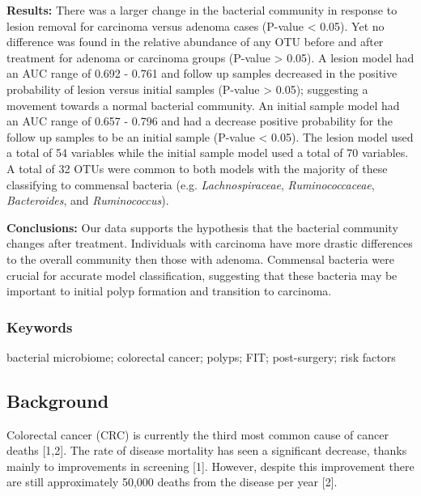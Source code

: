 \documentclass[12pt,]{article}
\begin{document}
\textbf{Results:} There was a larger change in the bacterial community
in response to lesion removal for carcinoma versus adenoma cases
(P-value \textless{} 0.05). Yet no difference was found in the relative
abundance of any OTU before and after treatment for adenoma or carcinoma
groups (P-value \textgreater{} 0.05). A lesion model had an AUC range of
0.692 - 0.761 and follow up samples decreased in the positive
probability of lesion versus initial samples (P-value \textgreater{}
0.05); suggesting a movement towards a normal bacterial community. An
initial sample model had an AUC range of 0.657 - 0.796 and had a
decrease positive probability for the follow up samples to be an initial
sample (P-value \textless{} 0.05). The lesion model used a total of 54
variables while the initial sample model used a total of 70 variables. A
total of 32 OTUs were common to both models with the majority of these
classifying to commensal bacteria (e.g. \emph{Lachnospiraceae},
\emph{Ruminococcaceae}, \emph{Bacteroides}, and \emph{Ruminococcus}).

\textbf{Conclusions:} Our data supports the hypothesis that the
bacterial community changes after treatment. Individuals with carcinoma
have more drastic differences to the overall community then those with
adenoma. Commensal bacteria were crucial for accurate model
classification, suggesting that these bacteria may be important to
initial polyp formation and transition to carcinoma.

\newpage

\subsubsection{Keywords}\label{keywords}

bacterial microbiome; colorectal cancer; polyps; FIT; post-surgery; risk
factors

\newpage

\subsection{Background}\label{background}

Colorectal cancer (CRC) is currently the third most common cause of
cancer deaths {[}1,2{]}. The rate of disease mortality has seen a
significant decrease, thanks mainly to improvements in screening
{[}1{]}. However, despite this improvement there are still approximately
50,000 deaths from the disease per year {[}2{]}.
\end{document}
